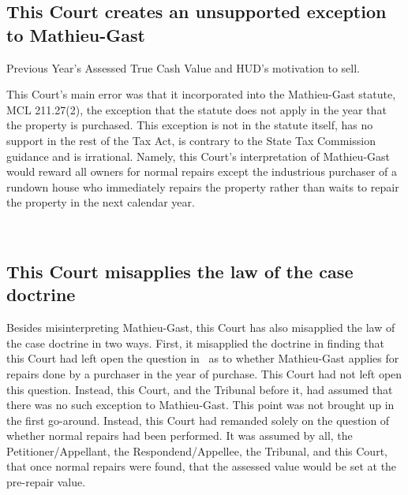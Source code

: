 \documentclass[12pt,\documentclassflag]{michiganCourtOfAppealsBrief}
\begin{document}
\subsection{This Court creates an unsupported exception to Mathieu-Gast}

Previous Year's Assessed True Cash Value and
HUD's motivation to sell.


This Court's main error was that it incorporated into the Mathieu-Gast statute, MCL 211.27(2), the exception that the statute does not apply in the year that the property is purchased. This exception is not in the statute itself, has no support in the rest of the Tax Act, is contrary to the State Tax Commission guidance and is irrational. Namely, this Court's interpretation of Mathieu-Gast would reward all owners for normal repairs except the industrious purchaser of a rundown house who immediately repairs the property rather than waits to repair the property in the next calendar year.

\
\subsection{This Court misapplies the law of the case doctrine}

Besides misinterpreting Mathieu-Gast, this Court has also misapplied the law of the case doctrine in two ways. First, it misapplied the doctrine in finding that this Court had left open the question in \cite{Patru 1}\ as to whether Mathieu-Gast applies for repairs done by a purchaser in the year of purchase. This Court had not left open this question. Instead, this Court, and the Tribunal before it, had assumed that there was no such exception to Mathieu-Gast. This point was not brought up in the first go-around.
Instead, this Court had remanded solely on the question of whether normal repairs had been performed. 
It was assumed by all, the Petitioner/Appellant, the Respondend/Appellee, the Tribunal, and this Court, that once normal repairs were found, that the assessed value would be set at the pre-repair value.
\end{document}
